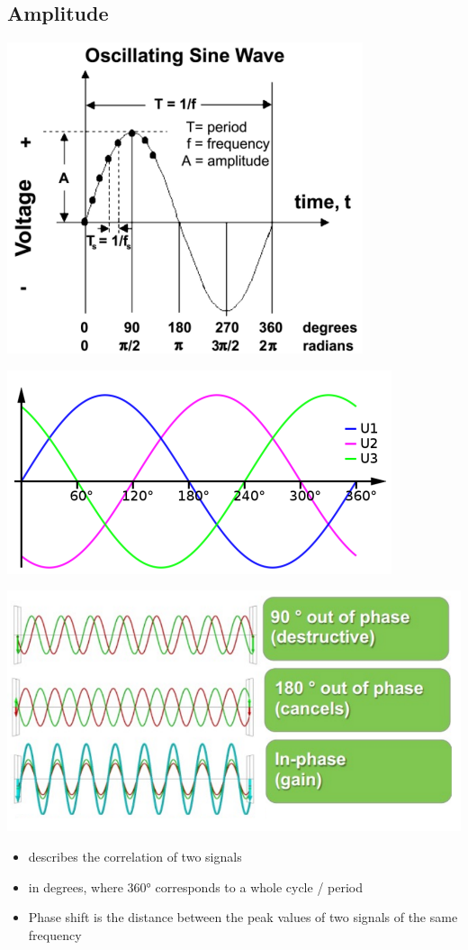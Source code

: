 \documentclass[11pt]{article}
\begin{document}
\subsection{Amplitude}
\includegraphics[width=\textwidth]{phase-1}

\includegraphics[width=\textwidth]{phase-2}

\includegraphics[width=\textwidth]{phase-3}
\begin{itemize}
    \item describes the correlation of two signals
    \item in degrees, where 360° corresponds to a whole cycle / period
    \item Phase shift is the distance between the peak values of two signals of the same frequency
\end{itemize}
\end{document}
